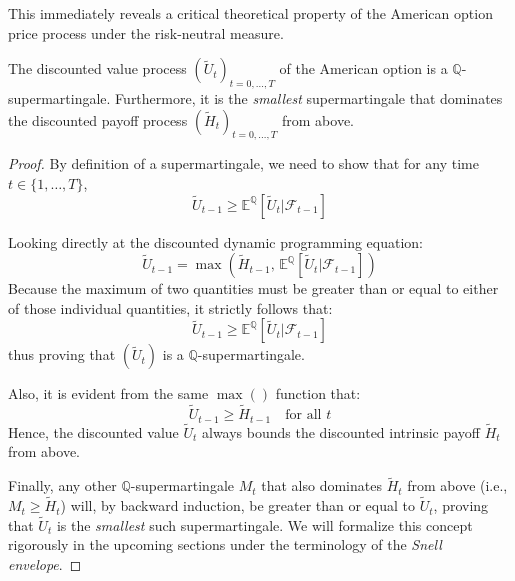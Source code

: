 This immediately reveals a critical theoretical property of the American option price process under the risk-neutral measure.

\begin{proposition}
The discounted value process $(\tilde{U}_t)_{t=0, \dots, T}$ of the American option is a $\mathbb{Q}$-supermartingale. Furthermore, it is the \textit{smallest} supermartingale that dominates the discounted payoff process $(\tilde{H}_t)_{t=0, \dots, T}$ from above.
\end{proposition}

\begin{proof}
By definition of a supermartingale, we need to show that for any time $t \in \{1,\dots,T\}$, 
$$ \tilde{U}_{t-1} \geq \mathbb{E}^{\mathbb{Q}}\left[ \tilde{U}_t \Big| \mathcal{F}_{t-1} \right] $$ 

Looking directly at the discounted dynamic programming equation:
$$
\tilde{U}_{t-1} = \max\left( \tilde{H}_{t-1}, \, \mathbb{E}^{\mathbb{Q}}\left[ \tilde{U}_t \Big| \mathcal{F}_{t-1} \right] \right)
$$
Because the maximum of two quantities must be greater than or equal to either of those individual quantities, it strictly follows that:
$$ \tilde{U}_{t-1} \geq \mathbb{E}^{\mathbb{Q}}\left[ \tilde{U}_t \Big| \mathcal{F}_{t-1} \right] $$
thus proving that $(\tilde{U}_t)$ is a $\mathbb{Q}$-supermartingale.

Also, it is evident from the same $\max()$ function that:
$$ \tilde{U}_{t-1} \geq \tilde{H}_{t-1} \quad \text{for all } t $$
Hence, the discounted value $\tilde{U}_t$ always bounds the discounted intrinsic payoff $\tilde{H}_t$ from above.

Finally, any other $\mathbb{Q}$-supermartingale $M_t$ that also dominates $\tilde{H}_t$ from above (i.e., $M_t \geq \tilde{H}_t$) will, by backward induction, be greater than or equal to $\tilde{U}_t$, proving that $\tilde{U}_t$ is the \textit{smallest} such supermartingale. We will formalize this concept rigorously in the upcoming sections under the terminology of the \textit{Snell envelope}.
\end{proof}
